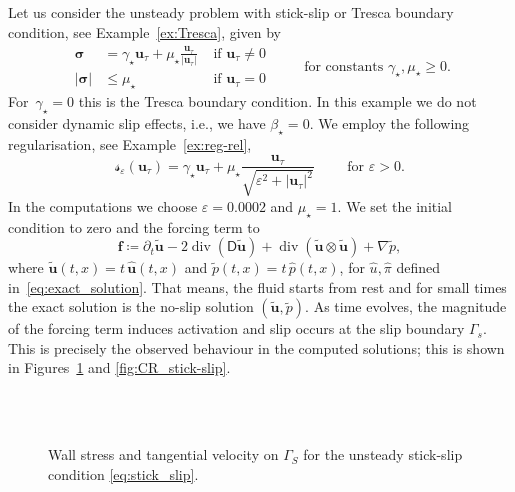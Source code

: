 \documentclass[reqno,a4paper]{amsart}
\def\tens#1{\pmb{\mathsf{#1}}}
\def\vec#1{\boldsymbol{#1}}
\def\diver{\mathop{\mathrm{div}}\nolimits} %
\def\bu{\vec{u}}
\def\bsigma{\vec{\sigma}}
\def\BD{\tens{D}}
\def\Srel{\vec{\mathcal{s}}}
\def\Seps{\Srel_{\varepsilon}}
\begin{document}
	Let us consider the unsteady problem with stick-slip or Tresca boundary condition, see Example~\ref{ex:Tresca}, given by
	\begin{equation}\label{eq:stick_slip}
		\begin{array}{rlr}
			\bsigma &= \gamma_\star \bu_\tau + \mu_\star \frac{\bu_\tau}{|\bu_\tau|}  & \text{ if }\bu_\tau \neq 0  \\
			|\bsigma| &\leq \mu_\star  & \text{ if }\bu_\tau = 0
		\end{array}
		\qquad
		\text{ for constants   }	\gamma_\star,\mu_\star \geq 0.
	\end{equation}
	For~$\gamma_\star=0$ this is the Tresca boundary condition.  
	In this example we do not consider dynamic slip effects, i.e., we have $\beta_\star=0$.
	We employ the following regularisation, see Example~\ref{ex:reg-rel},
	\begin{equation}
		\Seps(\bu_\tau) = \gamma_\star \bu_\tau + \mu_\star \frac{\bu_\tau}{\sqrt{\varepsilon^2 + |\bu_\tau|^2}}
		\qquad \text{ for }
		\varepsilon>0.
	\end{equation}
	In the computations we choose $\varepsilon = 0.0002$ and $\mu_\star = 1$. 
	We set the initial condition to zero and the forcing term to $$\bm{f}\coloneqq \partial_t \tilde{\bu} - 
	2 %
	\diver( \BD\tilde{\bu}) + \diver(\tilde{\bu}\otimes \tilde{\bu}) + \nabla\tilde{p},$$ where $\tilde{\bu}(t,x)= t \, \hat{\bu}(t,x)$ and $\tilde{p}(t,x)= t\, \hat{p}(t,x)$, for $\hat u, \hat \pi$ defined in~\eqref{eq:exact_solution}.
	That means, the fluid starts from rest and for small times the exact solution is the no-slip solution $(\tilde{\bu},\tilde{p})$. 
	As time evolves, the magnitude of the forcing term induces activation and slip occurs at the slip boundary $\Gamma_s$.
	This is precisely the observed behaviour in the computed solutions; this is shown in Figures~\ref{fig:slice_st-slip} and \ref{fig:CR_stick-slip}.
	
	\begin{figure}
		\centering
		\\
		\\
		\caption{Wall stress and tangential velocity on $\Gamma_S$ for the unsteady stick-slip condition \eqref{eq:stick_slip}.}%
		\label{fig:slice_st-slip}
	\end{figure}
	
\end{document}
